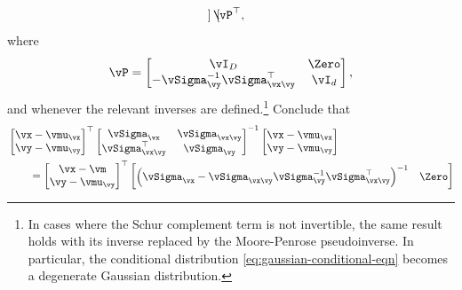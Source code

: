 \documentclass[../../book-main.tex]{subfiles}
\begin{document}
\begin{exercise}
\begin{enumerate}
\begin{equation}
\begin{bmatrix}
                \end{bmatrix}
                \vP^\top,
            \end{equation}
            where
            \begin{equation}
                \vP =
                \begin{bmatrix}
                    \vI_D & \Zero\\
                    -\vSigma_{\vy}^{-1}\vSigma_{\vx\vy}^\top & \vI_d
                \end{bmatrix},
            \end{equation}
            and whenever the relevant inverses are
            defined.\footnote{In cases where the
                Schur complement term is not invertible, the same
                result holds with its
                inverse replaced by the Moore-Penrose pseudoinverse.
                In particular, the
                conditional distribution
                \eqref{eq:gaussian-conditional-eqn} becomes
            a degenerate Gaussian distribution.}
            Conclude that
            \begin{align}
                &
                \begin{bmatrix}
                    \vx-\vmu_{\vx} \\
                    \vy-\vmu_{\vy}
                \end{bmatrix}^{\top}
                \begin{bmatrix}
                    \vSigma_{\vx} & \vSigma_{\vx\vy} \\
                    \vSigma_{\vx\vy}^\top & \vSigma_{\vy}
                \end{bmatrix}^{-1}
                \begin{bmatrix}
                    \vx-\vmu_{\vx} \\
                    \vy-\vmu_{\vy}
                \end{bmatrix}
                \\
                &\qquad=
                \begin{bmatrix}
                    \vx - \vm \\
                    \vy - \vmu_{\vy}
                \end{bmatrix}^\top
                \begin{bmatrix}
                    \left(\vSigma_{\vx} - \vSigma_{\vx\vy}
                        \vSigma_{\vy}^{-1}
                    \vSigma_{\vx\vy}^{\top}\right)^{-1} & \Zero \\

\end{bmatrix}
\end{align}
\end{enumerate}
\end{exercise}
\end{document}
